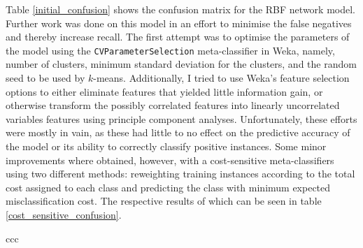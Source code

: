 \documentclass[paper=a4, fontsize=11pt]{scrartcl} %
\numberwithin{equation}{section} %
\numberwithin{figure}{section} %
\numberwithin{table}{section} %
\begin{document}
Table \ref{initial_confusion} shows the confusion matrix for the RBF network model. Further work was done on this model in an effort to minimise the false negatives and thereby increase recall. The first attempt was to optimise the parameters of the model using the \texttt{CVParameterSelection} meta-classifier in Weka, namely, number of clusters, minimum standard deviation for the clusters, and the random seed to be used by $k$-means. Additionally, I tried to use Weka's feature selection options to either eliminate features that yielded little information gain, or otherwise transform the possibly correlated features into linearly uncorrelated variables features using principle component analyses. Unfortunately, these efforts were mostly in vain, as these had little to no effect on the predictive accuracy of the model or its ability to correctly classify positive instances. Some minor improvements where obtained, however, with a cost-sensitive meta-classifiers using two different methods: reweighting training instances according to the total cost assigned to each class and predicting the class with minimum expected misclassification cost\cite{weka_cost}. The respective results of which can be seen in table \ref{cost_sensitive_confusion}.
\begin{table}[thb]
\centering
\caption{\label{cost_sensitive_confusion}Confusion Matrix}
\begin{tabular}{ccc}
\end{tabular}
\end{table}
\end{document}
